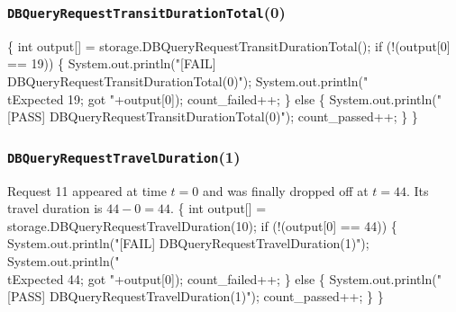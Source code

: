 \documentclass{article}
\def\nwendcode{\endtrivlist \endgroup}
\let\nwdocspar=\par
\begin{document}
\subsubsection{{\tt{}DBQueryRequestTransitDurationTotal}(0)}
\nwenddocs{}\endmoddef{}
\{
  int output[] = storage.DBQueryRequestTransitDurationTotal();
  if (!(output[0] == 19)) \{
    System.out.println("[FAIL] DBQueryRequestTransitDurationTotal(0)");
    System.out.println("\\tExpected 19; got "+output[0]);
    count_failed++;
  \} else \{
    System.out.println("[PASS] DBQueryRequestTransitDurationTotal(0)");
    count_passed++;
  \}
\}
\nwendcode{}\nwdocspar
\subsubsection{{\tt{}DBQueryRequestTravelDuration}(1)}
Request 11 appeared at time $t=0$ and was finally dropped off at $t=44$. Its
travel duration is $44-0=44$.
\nwenddocs{}\endmoddef{}
\{
  int output[] = storage.DBQueryRequestTravelDuration(10);
  if (!(output[0] == 44)) \{
    System.out.println("[FAIL] DBQueryRequestTravelDuration(1)");
    System.out.println("\\tExpected 44; got "+output[0]);
    count_failed++;
  \} else \{
    System.out.println("[PASS] DBQueryRequestTravelDuration(1)");
    count_passed++;
  \}
\}
\nwendcode{}\nwdocspar
\end{document}
